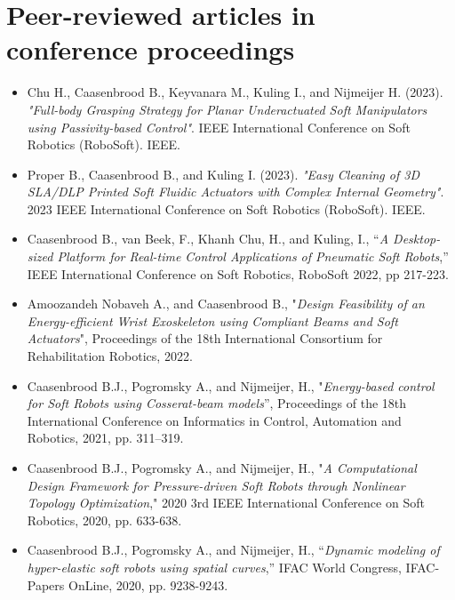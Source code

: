 \section*{Peer-reviewed articles in conference proceedings}
\begin{itemize}[leftmargin=2mm]
\small
\setlength\itemsep{0.0em}
\item Chu H., Caasenbrood B., Keyvanara M., Kuling I., and Nijmeijer H. (2023). \textit{"Full-body Grasping Strategy for Planar Underactuated Soft Manipulators using Passivity-based Control"}. IEEE International Conference on Soft Robotics (RoboSoft). IEEE.
\item Proper B., Caasenbrood B., and Kuling I. (2023). \textit{"Easy Cleaning of 3D SLA/DLP Printed Soft Fluidic Actuators with Complex Internal Geometry"}. 2023 IEEE International Conference on Soft Robotics (RoboSoft). IEEE.

\item Caasenbrood B., van Beek, F., Khanh Chu, H., and Kuling, I., “\textit{A Desktop-sized Platform for Real-time Control Applications of Pneumatic Soft Robots},” IEEE International Conference on Soft Robotics, RoboSoft 2022, pp 217-223.

\item Amoozandeh Nobaveh A., and Caasenbrood B., "\textit{Design Feasibility of an Energy-efficient Wrist Exoskeleton
using Compliant Beams and Soft Actuators}", Proceedings of the 18th International  Consortium for Rehabilitation Robotics, 2022.

\item  Caasenbrood B.J., Pogromsky A., and Nijmeijer, H., "\textit{Energy-based control for Soft Robots using Cosserat-beam models}”, Proceedings of the 18th International Conference on Informatics in Control, Automation and Robotics, 2021, pp. 311–319.
\item Caasenbrood B.J., Pogromsky A., and Nijmeijer, H., "\textit{A Computational Design Framework for Pressure-driven Soft Robots through Nonlinear Topology Optimization}," 2020 3rd IEEE International Conference on Soft Robotics, 2020, pp. 633-638.
\item Caasenbrood B.J., Pogromsky A., and Nijmeijer, H., “\textit{Dynamic modeling of hyper-elastic soft robots using spatial curves},” IFAC World Congress, IFAC-Papers OnLine, 2020, pp. 9238-9243.
\end{itemize}

